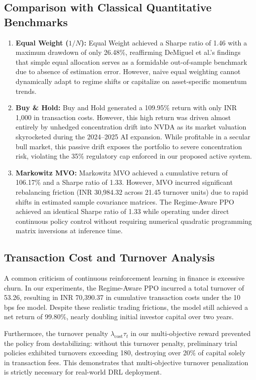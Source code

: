 \documentclass[conference]{IEEEtran}
\begin{document}
\subsection{Comparison with Classical Quantitative Benchmarks}
\begin{enumerate}
    \item \textbf{Equal Weight ($1/N$):} Equal Weight achieved a Sharpe ratio of 1.46 with a maximum drawdown of only 26.48\%, reaffirming DeMiguel et al.'s findings \cite{demiguel2009optimal} that simple equal allocation serves as a formidable out-of-sample benchmark due to absence of estimation error. However, naive equal weighting cannot dynamically adapt to regime shifts or capitalize on asset-specific momentum trends.
    \item \textbf{Buy \& Hold:} Buy and Hold generated a 109.95\% return with only INR 1,000 in transaction costs. However, this high return was driven almost entirely by unhedged concentration drift into NVDA as its market valuation skyrocketed during the 2024--2025 AI expansion. While profitable in a secular bull market, this passive drift exposes the portfolio to severe concentration risk, violating the 35\% regulatory cap enforced in our proposed active system.
    \item \textbf{Markowitz MVO:} Markowitz MVO achieved a cumulative return of 106.17\% and a Sharpe ratio of 1.33. However, MVO incurred significant rebalancing friction (INR 30,984.32 across 21.45 turnover units) due to rapid shifts in estimated sample covariance matrices. The Regime-Aware PPO achieved an identical Sharpe ratio of 1.33 while operating under direct continuous policy control without requiring numerical quadratic programming matrix inversions at inference time.
\end{enumerate}

\subsection{Transaction Cost and Turnover Analysis}
A common criticism of continuous reinforcement learning in finance is excessive churn. In our experiments, the Regime-Aware PPO incurred a total turnover of 53.26, resulting in INR 70,390.37 in cumulative transaction costs under the 10 bps fee model. Despite these realistic trading frictions, the model still achieved a net return of 99.80\%, nearly doubling initial investor capital over two years. 

Furthermore, the turnover penalty $\lambda_{\text{cost}} \tau_t$ in our multi-objective reward prevented the policy from destabilizing: without this turnover penalty, preliminary trial policies exhibited turnovers exceeding 180, destroying over 20\% of capital solely in transaction fees. This demonstrates that multi-objective turnover penalization is strictly necessary for real-world DRL deployment.
\end{document}
